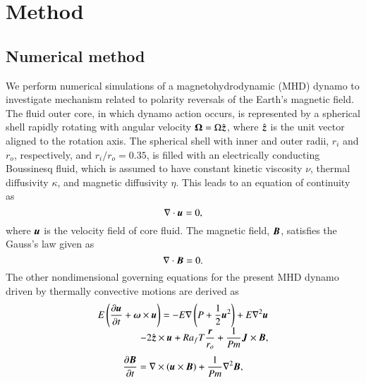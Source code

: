 \section{Method}
\label{section:method}

\subsection{Numerical method}

We perform numerical simulations of a magnetohydrodynamic (MHD) dynamo to investigate mechanism related to polarity reversals of the Earth's magnetic field.
The fluid outer core, in which dynamo action occurs, is represented by a spherical shell rapidly rotating with angular velocity $\mbox{\boldmath$\Omega$} = \Omega \hat{\mbox{\boldmath$z$}}$, where $\hat{\mbox{\boldmath$z$}}$ is the unit vector aligned to the rotation axis.
The spherical shell with inner and outer radii, $r_i$ and $r_o$, respectively, and $r_i / r_o = 0.35$, is filled with an electrically conducting Boussinesq fluid, which is assumed to have constant kinetic viscosity $\nu$, thermal diffusivity $\kappa$, and magnetic diffusivity $\eta$.
This leads to an equation of continuity as
%
\begin{equation}
\nabla \cdot \mbox{\boldmath$u$} = 0,
\label{eq:divu=0}
\end{equation}
%
where $\mbox{\boldmath$u$}$ is the velocity field of core fluid.
The magnetic field, $\mbox{\boldmath$B$}$, satisfies the Gauss's law given as
%
\begin{equation}
\nabla \cdot \mbox{\boldmath$B$} = 0.
\label{eq:divB=0}
\end{equation}
%
The other nondimensional governing equations for the present MHD dynamo driven by thermally convective motions are derived as
%
\begin{equation}
\begin{array}{l}
\displaystyle
E \left( \frac{\partial\bvec{u}}{\partial t} +
 \bvec{\omega} \times \bvec{u} \right) =
 - E \nabla \left( P + \frac{1}{2} \bvec{u}^2 \right)
 + E \nabla^2 \bvec{u}
\\
\displaystyle
\hspace*{\fill}
 -2 \hat{\bvec{z}} \times \bvec{u}
 + Ra_f T \frac{\bvec{r}}{r_o}
 + \frac{1}{Pm} \bvec{J} \times \bvec{B} ,
\end{array}
\label{eq:momentum}
\end{equation}
%
\begin{equation}
\frac{\partial \mbox{\boldmath$B$}}{\partial t} =
 \nabla \times (\mbox{\boldmath$u$} \times \mbox{\boldmath$B$} )
 + \frac{1}{Pm} \nabla^2 \mbox{\boldmath$B$} ,
\label{eq:induction}
\end{equation}
